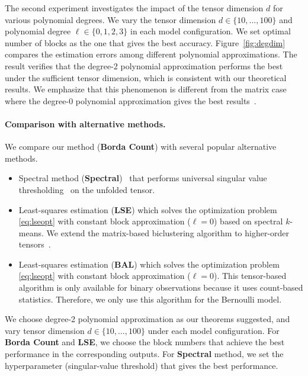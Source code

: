 \documentclass[12pt]{article}
\theoremstyle{definition}
\begin{document}
The second experiment investigates the impact of the tensor dimension $d$ for various polynomial degrees. We vary the tensor dimension $d\in\{10,\ldots,100\}$ and polynomial degree $\ell\in\{0,1,2,3\}$ in each model configuration. We set optimal number of blocks as the one that gives the best accuracy. Figure~\ref{fig:degdim} compares the estimation errors among different polynomial approximations. The result verifies that the degree-2 polynomial approximation performs the best under the sufficient tensor dimension, which is consistent with our theoretical results. We emphasize that this phenomenon is different from the matrix case where the degree-0 polynomial approximation gives the best results~\citep{gao2015rate,klopp2017oracle}.


\paragraph{Comparison with alternative methods.} We compare our method ({\bf \small Borda Count}) with several popular alternative methods. 
\begin{itemize}[wide, labelwidth=0pt, labelindent=0pt,topsep=0pt,itemsep=-1ex]
    \item  Spectral method ({\bf \small Spectral})~\citep{xu2018rates} that performs universal singular value thresholding~\citep{chatterjee2015matrix} on the unfolded tensor.
    \item Least-squares estimation ({\bf \small LSE}) \citep{gao2015rate} which solves the optimization problem \eqref{eq:lseopt} with constant block approximation ($\ell=0$) based on spectral $k$-means. We extend the matrix-based biclustering algorithm to higher-order tensors~\cite{han2020exact}. 
    \item Least-squares estimation ({\bf \small BAL}) \citep{balasubramanian2021nonparametric} which solves the optimization problem \eqref{eq:lseopt} with constant block approximation ($\ell=0$). This tensor-based algorithm is only available for binary observations because it uses count-based statistics. Therefore, we only use this algorithm for the Bernoulli model.
\end{itemize}
 We choose degree-2 polynomial approximation as our theorems suggested, and vary tensor dimension $d\in\{10,\ldots,100\}$ under each model configuration. For {\bf \small Borda Count} and {\bf \small LSE}, we choose the block numbers that achieve the best performance in the corresponding outputs. For {\bf \small Spectral} method, we set the hyperparameter (singular-value threshold) that gives the best performance. 
\end{document}
